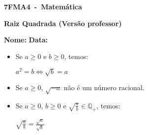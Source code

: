 \documentclass[a4paper,14pt]{article}
\begin{document}
	
	\noindent\textbf{7FMA4~-~Matemática} 
	
	\begin{center}
		\textbf{Raiz Quadrada (Versão professor)}
	\end{center}
	
	\bigskip
	
	\noindent\textbf{Nome:} \underline{\hspace{10cm}}
    \noindent\textbf{Data:} \underline{\hspace{4cm}}
	
	\bigskip
	
	\begin{multicols}{2}
	\begin{itemize}
		\item Se $a \geq 0$ e $b \geq 0$, temos:
		\begin{center}
			$a^2 = b \Leftrightarrow \sqrt{b} = a$
		\end{center}
	    \item Se $a \geq 0$, $\sqrt{-a}$ não é um número racional.
	    \item Se $a \geq 0$, $b \geq 0$ e $\sqrt{\frac{a}{b}} \in \mathbb{Q_+}$, temos:
	    \begin{center}
	    	$\sqrt{\frac{a}{b}} = \frac{\sqrt{a}}{\sqrt{b}}$
	    \end{center}  
	\end{itemize}
	\begin{enumerate}
		

\end{enumerate}
\end{multicols}
\end{document}
